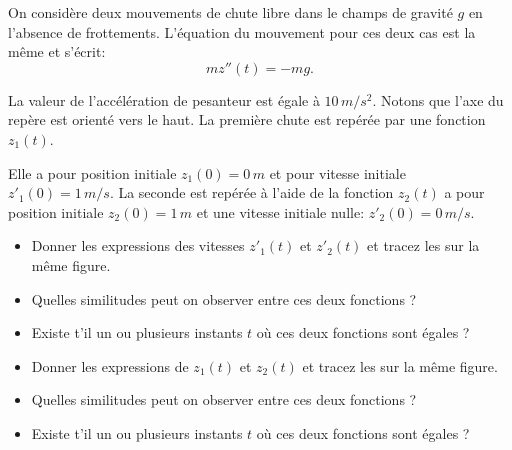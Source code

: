 \bexo

On considère deux mouvements de chute libre dans le champs de gravité $g$ en l'absence de frottements. L'équation du mouvement pour ces deux cas est la même et s'écrit:
\begin{equation}
mz''(t)=-mg.
\end{equation}

La valeur de l'accélération de pesanteur est égale à $10\,m/s^2$. Notons que l'axe du repère est orienté vers le haut. La première chute est repérée par une fonction $z_1(t)$. 

Elle a pour position initiale $z_1(0)=0\,m$ et pour vitesse initiale $z'_1(0)=1\,m/s$.  La seconde est repérée à l'aide de la fonction $z_2(t)$ a pour position initiale $z_2(0)=1\,m$ et une vitesse initiale nulle: $z'_2(0)=0\,m/s$.

\begin{itemize}
\item Donner les expressions des vitesses $z'_1(t)$ et $z'_2(t)$ et tracez les sur la même figure. 
\item Quelles similitudes peut on observer entre ces deux fonctions ? 
\item Existe t'il un ou plusieurs instants $t$ où ces deux fonctions sont égales ?
\item Donner les expressions de $z_1(t)$ et $z_2(t)$ et tracez les sur la même figure.
\item Quelles similitudes peut on observer entre ces deux fonctions ? 
\item Existe t'il un ou plusieurs instants $t$ où ces deux fonctions sont égales ?
\end{itemize}


\eexo
